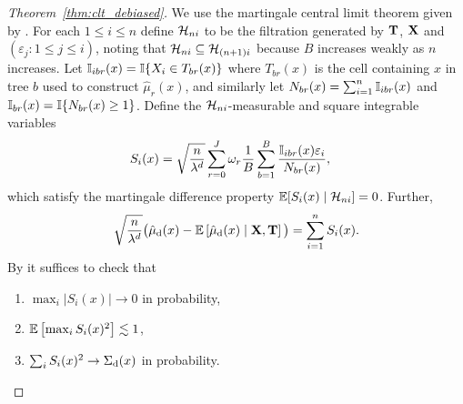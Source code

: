 \begin{proof}[Theorem~\ref{thm:clt_debiased}]

  We use the martingale central limit theorem given by
  \citet[Theorem~3.2]{hall2014martingale}.
  For each $1 \leq i \leq n$ define
  $\mathcal{H}_{n i}$ to be the filtration
  generated by $\mathbf{T}$, $\mathbf{X}$ and
  $(\varepsilon_j : 1 \leq j \leq i)$,
  noting that $\mathcal{H}_{n i} \subseteq \mathcal{H}_{(n+1)i}$
  because $B$ increases weakly as $n$ increases.
  Let $\mathbb{I}_{i b r}(x) = \mathbb{I}\{X_i \in T_{b r}(x)\}$
  where $T_{b r}(x)$ is the cell containing $x$ in tree $b$
  used to construct $\hat \mu_r(x)$,
  and similarly let $N_{b r}(x) = \sum_{i=1}^n \mathbb{I}_{i b r}(x)$
  and $\mathbb{I}_{b r}(x) = \mathbb{I}\{N_{b r}(x) \geq 1\}$.
  Define the $\mathcal{H}_{n i}$-measurable and square integrable
  variables
  \begin{align*}
    S_i(x)
    &=
    \sqrt{\frac{n}{\lambda^d}}
    \sum_{r=0}^{J}
    \omega_r
    \frac{1}{B} \sum_{b=1}^B
    \frac{\mathbb{I}_{i b r}(x) \varepsilon_i} {N_{b r}(x)},
  \end{align*}
  which satisfy the martingale
  difference property
  $\mathbb{E} [ S_i(x) \mid \mathcal{H}_{n i} ] = 0$.
  Further,
  \begin{align*}
    \sqrt{\frac{n}{\lambda^d}}
    \big(
      \hat\mu_{\mathrm{d}}(x)
      - \mathbb{E}\left[
        \hat\mu_{\mathrm{d}}(x) \mid \mathbf{X}, \mathbf{T}
      \right]
    \big)
    = \sum_{i=1}^n S_i(x).
  \end{align*}
  By \citet[Theorem~3.2]{hall2014martingale}
  it suffices to check that
  \begin{enumerate}[label=(\roman*)]
    \item $\max_i |S_i(x)| \to 0$ in probability,
    \item $\mathbb{E}\left[\max_i S_i(x)^2\right] \lesssim 1$,
    \item $\sum_i S_i(x)^2 \to \Sigma_{\mathrm{d}}(x)$ in probability.
  \end{enumerate}


\end{proof}
